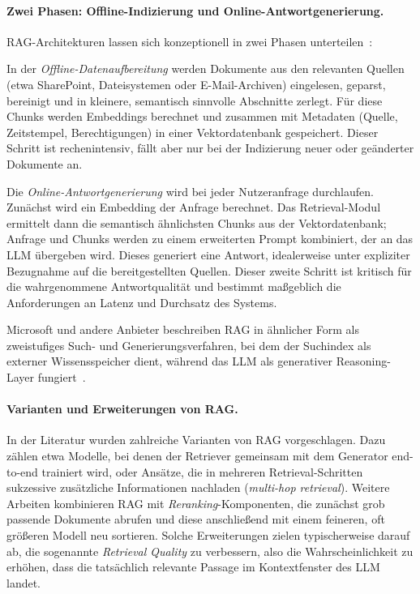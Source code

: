 \paragraph{Zwei Phasen: Offline-Indizierung und Online-Antwortgenerierung.}

RAG-Architekturen lassen sich konzeptionell in zwei Phasen unterteilen~\cite{gao2023retrieval}:

In der \textit{Offline-Datenaufbereitung} werden Dokumente aus den relevanten Quellen (etwa SharePoint, Dateisystemen oder E-Mail-Archiven) eingelesen, geparst, bereinigt und in kleinere, semantisch sinnvolle Abschnitte zerlegt.
Für diese Chunks werden Embeddings berechnet und zusammen mit Metadaten (Quelle, Zeitstempel, Berechtigungen) in einer Vektordatenbank gespeichert.
Dieser Schritt ist rechenintensiv, fällt aber nur bei der Indizierung neuer oder geänderter Dokumente an.

Die \textit{Online-Antwortgenerierung} wird bei jeder Nutzeranfrage durchlaufen.
Zunächst wird ein Embedding der Anfrage berechnet.
Das Retrieval-Modul ermittelt dann die semantisch ähnlichsten Chunks aus der Vektordatenbank; Anfrage und Chunks werden zu einem erweiterten Prompt kombiniert, der an das LLM übergeben wird.
Dieses generiert eine Antwort, idealerweise unter expliziter Bezugnahme auf die bereitgestellten Quellen.
Dieser zweite Schritt ist kritisch für die wahrgenommene Antwortqualität und bestimmt maßgeblich die Anforderungen an Latenz und Durchsatz des Systems.

Microsoft und andere Anbieter beschreiben RAG in ähnlicher Form als zweistufiges Such- und Generierungsverfahren, bei dem der Suchindex als externer Wissensspeicher dient, während das LLM als generativer Reasoning-Layer fungiert~\cite{gao2023retrieval}.

\paragraph{Varianten und Erweiterungen von RAG.}

In der Literatur wurden zahlreiche Varianten von RAG vorgeschlagen.
Dazu zählen etwa Modelle, bei denen der Retriever gemeinsam mit dem Generator end-to-end trainiert wird, oder Ansätze, die in mehreren Retrieval-Schritten sukzessive zusätzliche Informationen nachladen (\textit{multi-hop retrieval}).
Weitere Arbeiten kombinieren RAG mit \textit{Reranking}-Komponenten, die zunächst grob passende Dokumente abrufen und diese anschließend mit einem feineren, oft größeren Modell neu sortieren.
Solche Erweiterungen zielen typischerweise darauf ab, die sogenannte \textit{Retrieval Quality} zu verbessern, also die Wahrscheinlichkeit zu erhöhen, dass die tatsächlich relevante Passage im Kontextfenster des LLM landet.

